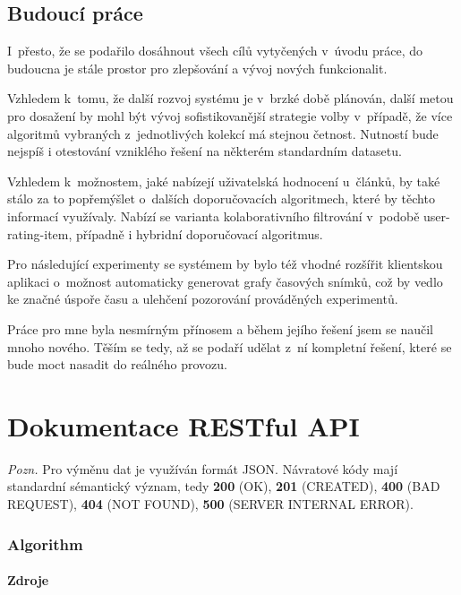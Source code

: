 \documentclass[thesis=M,czech]{FITthesis}[2014/05/07]
\begin{document}
\begin{conclusion}
\section{Budoucí práce}
I~přesto, že se podařilo dosáhnout všech cílů vytyčených v~úvodu práce, do budoucna je stále prostor pro zlepšování a vývoj nových funkcionalit.

Vzhledem k~tomu, že další rozvoj systému je v~brzké době plánován, další metou pro dosažení by mohl být vývoj sofistikovanější strategie volby v~případě, že více algoritmů vybraných z~jednotlivých kolekcí má stejnou četnost. Nutností bude nejspíš i otestování vzniklého řešení na některém standardním datasetu.

Vzhledem k~možnostem, jaké nabízejí uživatelská hodnocení u~článků, by také stálo za to popřemýšlet o~dalších doporučovacích algoritmech, které by těchto informací využívaly. Nabízí se varianta kolaborativního filtrování v~podobě user-rating-item, případně i hybridní doporučovací algoritmus.

Pro následující experimenty se systémem by bylo též vhodné rozšířit klientskou aplikaci o~možnost automaticky generovat grafy časových snímků, což by vedlo ke značné úspoře času a ulehčení pozorování prováděných experimentů.

Práce pro mne byla nesmírným přínosem a během jejího řešení jsem se naučil mnoho nového. Těším se tedy, až se podaří udělat z~ní kompletní řešení, které se bude moct nasadit do reálného provozu.
\end{conclusion}




\appendix

\chapter{Dokumentace RESTful API}
\label{restfulapi}

\emph{Pozn.} Pro výměnu dat je využíván formát JSON. Návratové kódy mají standardní sémantický význam, tedy \textbf{200} (OK), \textbf{201} (CREATED), \textbf{400} (BAD REQUEST), \textbf{404} (NOT FOUND), \textbf{500} (SERVER INTERNAL ERROR).

\subsection{Algorithm}

\subsubsection{Zdroje}
\end{document}

